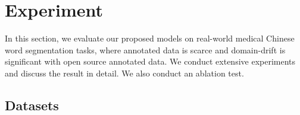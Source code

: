 \section{Experiment}

In this section, we evaluate our proposed models on real-world medical Chinese word segmentation tasks, where annotated data is scarce and domain-drift is significant with open source annotated data. We conduct extensive experiments and discuss the result in detail. We also conduct an ablation test.


\subsection{Datasets}\label{sec:datasets}





